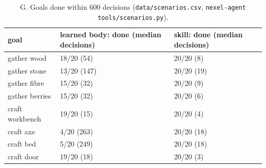 \begin{table}[h]\centering
\begin{tabular}{lll}\toprule
goal & learned body: done (median decisions) & skill: done (median decisions)\\\midrule
gather wood & 18/20 (54) & 20/20 (8)\\
gather stone & 13/20 (147) & 20/20 (19)\\
gather fibre & 15/20 (32) & 20/20 (9)\\
gather berries & 15/20 (32) & 20/20 (6)\\
craft workbench & 19/20 (15) & 20/20 (4)\\
craft axe & 4/20 (263) & 20/20 (18)\\
craft bed & 5/20 (249) & 20/20 (18)\\
craft door & 19/20 (18) & 20/20 (3)\\\bottomrule
\end{tabular}\caption{G. Goals done within 600 decisions (\texttt{data/scenarios.csv}, \texttt{nexel-agent tools/scenarios.py}).}
\end{table}
